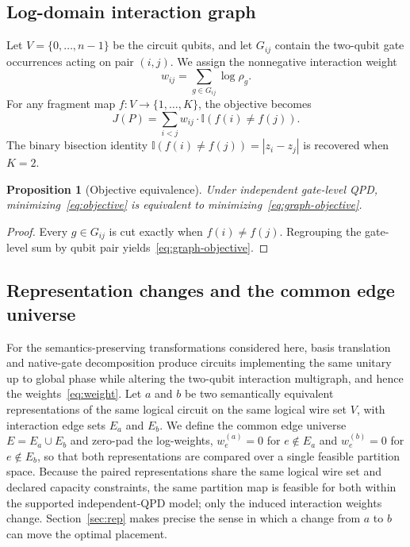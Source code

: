 \documentclass[
  aps,
  pra,
  reprint,
  amsmath,
  amssymb,
  longbibliography,
  nofootinbib,
  floatfix
]{revtex4-2}
\theoremstyle{plain}
\newtheorem{proposition}{Proposition}
\begin{document}
\subsection{Log-domain interaction graph}

Let $V=\{0,\ldots,n{-}1\}$ be the circuit qubits, and let $G_{ij}$ contain the two-qubit gate occurrences acting on pair $(i,j)$. We assign the nonnegative interaction weight
\begin{equation}
  w_{ij} = \sum_{g \in G_{ij}} \log \rho_g.
  \label{eq:weight}
\end{equation}
For any fragment map $f:V\rightarrow\{1,\ldots,K\}$, the objective becomes
\begin{equation}
  J(P) = \sum_{i < j} w_{ij} \cdot \mathbb{I}(f(i)\neq f(j)).
  \label{eq:graph-objective}
\end{equation}
The binary bisection identity $\mathbb{I}(f(i)\neq f(j))=|z_i-z_j|$ is recovered when $K=2$.

\begin{proposition}[Objective equivalence]\label{prop:obj-equiv}
Under independent gate-level QPD, minimizing~\eqref{eq:objective} is equivalent to minimizing~\eqref{eq:graph-objective}.
\end{proposition}
\begin{proof}
Every $g\in G_{ij}$ is cut exactly when $f(i)\neq f(j)$. Regrouping the gate-level sum by qubit pair yields~\eqref{eq:graph-objective}.
\end{proof}

\subsection{Representation changes and the common edge universe}
\label{sec:rep-changes}

For the semantics-preserving transformations considered here, basis translation and native-gate decomposition produce circuits implementing the same unitary up to global phase while altering the two-qubit interaction multigraph, and hence the weights~\eqref{eq:weight}. Let $a$ and $b$ be two semantically equivalent representations of the same logical circuit on the same logical wire set $V$, with interaction edge sets $E_a$ and $E_b$. We define the common edge universe $E=E_a\cup E_b$ and zero-pad the log-weights, $w^{(a)}_e=0$ for $e\notin E_a$ and $w^{(b)}_e=0$ for $e\notin E_b$, so that both representations are compared over a single feasible partition space. Because the paired representations share the same logical wire set and declared capacity constraints, the same partition map is feasible for both within the supported independent-QPD model; only the induced interaction weights change. Section~\ref{sec:rep} makes precise the sense in which a change from $a$ to $b$ can move the optimal placement.
\end{document}
